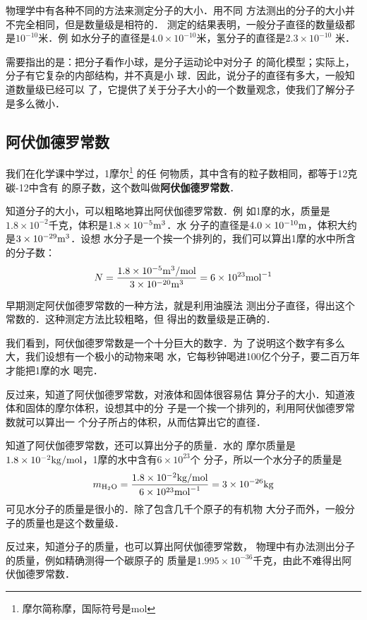    物理学中有各种不同的方法来测定分子的大小．用不同
方法测出的分子的大小并不完全相同，但是数量级是相符的．
测定的结果表明，一般分子直径的数量级都是$10^{-10}$米．例
如水分子的直径是$4.0\times 10^{-10}$米，氢分子的直径是$2.3\times 10^{-10}$
米．

    需要指出的是：把分子看作小球，是分子运动论中对分子
的简化模型；实际上，分子有它复杂的内部结构，并不真是小
球．因此，说分子的直径有多大，一般知道数量级已经可以
了，它提供了关于分子大小的一个数量观念，使我们了解分子
是多么微小．

    \subsection{阿伏伽德罗常数}

我们在化学课中学过，1摩尔\footnote{摩尔简称摩，国际符号是mol}
的任
何物质，其中含有的粒子数相同，都等于12克碳-12中含有
的原子数，这个数叫做\textbf{阿伏伽德罗常数}．

    知道分子的大小，可以粗略地算出阿伏伽德罗常数．例
如1摩的水，质量是$1.8\times 10^{-2}$千克，体积是$1.8\times 10^{-5}{\rm m}^3$．水
分子的直径是$4.0\times 10^{-10}{\rm m}$，体积大约是$3\times 10^{-29}{\rm m}^3$．设想
水分子是一个挨一个排列的，我们可以算出1摩的水中所含
的分子数：
\[N=\frac{1.8\times 10^{-5}{\rm m^3/mol}}{3\times 10^{-20}{\rm m^3}}=6\times 10^{23}{\rm mol}^{-1} \]

    早期测定阿伏伽德罗常数的一种方法，就是利用油膜法
测出分子直径，得出这个常数的．这种测定方法比较粗略，但
得出的数量级是正确的．

    我们看到，阿伏伽德罗常数是一个十分巨大的数字．为
了说明这个数字有多么大，我们设想有一个极小的动物来喝
水，它每秒钟喝进100亿个分子，要二百万年才能把1摩的水
喝完．

    反过来，知道了阿伏伽德罗常数，对液体和固体很容易估
算分子的大小．知道液体和固体的摩尔体积，设想其中的分
子是一个挨一个排列的，利用阿伏伽德罗常数就可以算出一
个分子所占的体积，从而估算出它的直径．

    知道了阿伏伽德罗常数，还可以算出分子的质量．水的
摩尔质量是$1.8\times 10^{-2}{\rm kg/mol}$，1摩的水中含有$6\times 10^{23}$个
分子，所以一个水分子的质量是
\[m_{\rm H_2 O}=\frac{1.8\times 10^{-2}{\rm kg/mol}}{6\times 10^{23}{\rm mol}^{-1}}=3\times 10^{-26}{\rm kg} \]
可见水分子的质量是很小的．除了包含几千个原子的有机物
大分子而外，一般分子的质量也是这个数量级．

    反过来，知道分子的质量，也可以算出阿伏伽德罗常数，
物理中有办法测出分子的质量，例如精确测得一个碳原子的
质量是$1.995\times 10^{-36}$千克，由此不难得出阿伏伽德罗常数．

